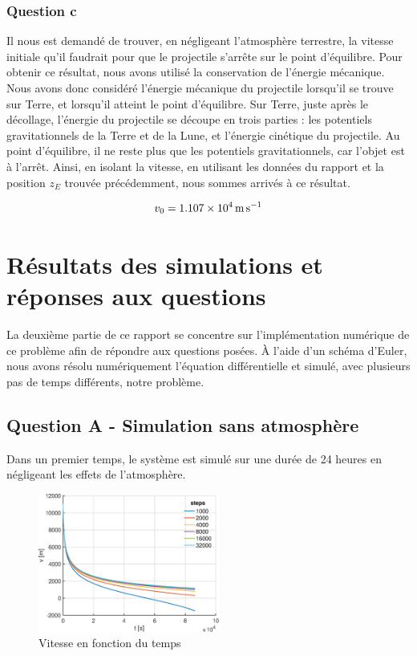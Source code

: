 \documentclass[a4paper,12pt,twoside]{article}
\begin{document}
\subsubsection*{Question c}
Il nous est demandé de trouver, en négligeant l'atmosphère terrestre, la vitesse initiale qu'il faudrait pour que le projectile s'arrête sur le point d'équilibre.
Pour obtenir ce résultat, nous avons utilisé la conservation de l'énergie mécanique.
Nous avons donc considéré l'énergie mécanique du projectile lorsqu'il se trouve sur Terre, et lorsqu'il atteint le point d'équilibre.
Sur Terre, juste après le décollage, l'énergie du projectile se découpe en trois parties :
les potentiels gravitationnels de la Terre et de la Lune, et l'énergie cinétique du projectile.
Au point d'équilibre, il ne reste plus que les potentiels gravitationnels, car l'objet est à l'arrêt.
Ainsi, en isolant la vitesse, en utilisant les données du rapport et la position $z_E$ trouvée précédemment, nous sommes arrivés à ce résultat.

\begin{equation}
    v_0 = \SI{1.107d4}{\meter\per\second}
    \label{val:v0}
\end{equation}


\section{Résultats des simulations et réponses aux questions}
La deuxième partie de ce rapport se concentre sur l'implémentation numérique de ce problème afin de répondre aux questions posées.
À l'aide d'un schéma d'Euler, nous avons résolu numériquement l'équation différentielle et simulé, avec plusieurs pas de temps différents, notre problème.

\subsection{Question A - Simulation sans atmosphère}
Dans un premier temps, le système est simulé sur une durée de 24 heures en négligeant les effets de l'atmosphère.

\begin{figure}[h]
	\centering
    \includegraphics[width=0.53\textwidth]{graphs/vA.eps}
    \caption{Vitesse en fonction du temps}
    \label{fig:A-vt}
\end{figure}
\end{document}
